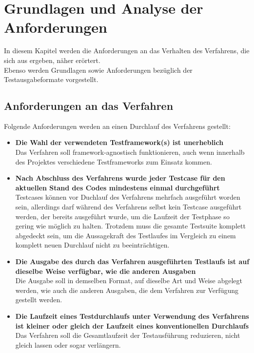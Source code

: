 \chapter{Grundlagen und Analyse der Anforderungen}\label{chap:Hintergrund}
In diesem Kapitel werden die Anforderungen an das Verhalten des Verfahrens, die sich aus  ergeben, näher erörtert.\\
Ebenso werden Grundlagen sowie Anforderungen bezüglich der Testausgabeformate vorgestellt. 

\section{Anforderungen an das Verfahren}\label{Anforderungen Tool}
Folgende Anforderungen werden an einen Durchlauf des Verfahrens gestellt:
\begin{itemize}
    \item \textbf{Die Wahl der verwendeten Testframework(s) ist unerheblich}\\
    Das Verfahren soll framework-agnostisch funktionieren, auch wenn innerhalb des Projektes verschiedene Testframeworks zum Einsatz kommen.
    \item \textbf{Nach Abschluss des Verfahrens wurde jeder Testcase für den aktuellen Stand des Codes mindestens einmal durchgeführt}\\
    Testcases können vor Duchlauf des Verfahrens mehrfach ausgeführt worden sein, allerdings darf während des Verfahrens selbst kein Testcase ausgeführt werden, der bereits ausgeführt wurde, um die Laufzeit der Testphase so gering wie möglich zu halten. Trotzdem muss die gesamte Testsuite komplett abgedeckt sein, um die Aussagekraft des Testlaufes im Vergleich zu einem komplett neuen Durchlauf nicht zu beeinträchtigen.
    \item \textbf{Die Ausgabe des durch das Verfahren ausgeführten Testlaufs ist auf dieselbe Weise verfügbar, wie die anderen Ausgaben}\\
    Die Ausgabe soll in demselben Format, auf dieselbe Art und Weise abgelegt werden, wie auch die anderen Ausgaben, die dem Verfahren zur Verfügung gestellt werden.
    \newpage
    \item \textbf{Die Laufzeit eines Testdurchlaufs unter Verwendung des Verfahrens ist kleiner oder gleich der Laufzeit eines konventionellen Durchlaufs}\\
    Das Verfahren soll die Gesamtlaufzeit der Testausführung reduzieren, nicht gleich lassen oder sogar verlängern.
\end{itemize}

